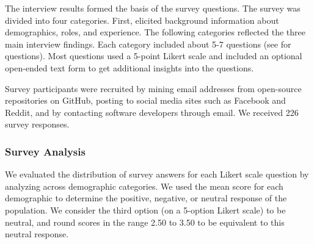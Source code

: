 
The interview results formed the basis of the survey questions. The survey was divided into four categories. First, elicited background information about demographics, roles, and experience. The following categories reflected the three main interview findings. Each category included about 5-7 questions (see \cite{companion_site} for questions). Most questions used a 5-point Likert scale and included an optional open-ended text form to get additional insights into the questions. 

Survey participants were recruited by mining email addresses from open-source repositories on GitHub, posting to social media sites such as Facebook and Reddit, and by contacting software developers through email. We received 226 survey responses.

\subsubsection{Survey Analysis}
We evaluated the distribution of survey answers for each Likert scale question by analyzing across demographic categories. 
We used the mean score for each demographic to determine the positive, negative, or neutral response of the population. 
We consider the third option (on a 5-option Likert scale) to be neutral, and round scores in the range 2.50 to 3.50 to be equivalent to this neutral response.
